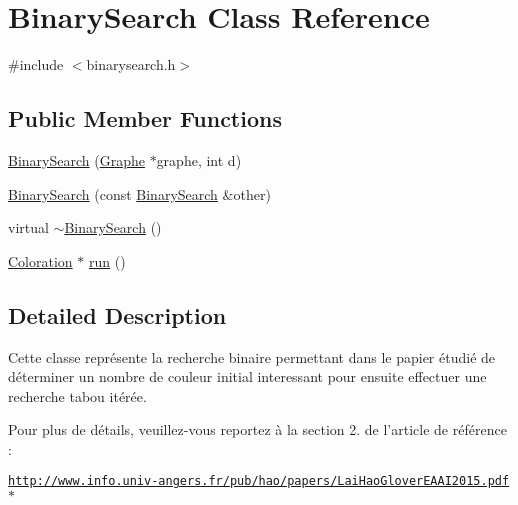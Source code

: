 \hypertarget{classBinarySearch}{\section{Binary\-Search Class Reference}
\label{classBinarySearch}
}


{\ttfamily \#include $<$binarysearch.\-h$>$}

\subsection*{Public Member Functions}
\begin{DoxyCompactItemize}
\item 
\hyperlink{classBinarySearch_a189641a6509564e762d4910efa5ff234}{Binary\-Search} (\hyperlink{classGraphe}{Graphe} $\ast$graphe, int d)
\item 
\hyperlink{classBinarySearch_a580de16a971e9cc0721bfe4ad438034e}{Binary\-Search} (const \hyperlink{classBinarySearch}{Binary\-Search} \&other)
\item 
virtual \hyperlink{classBinarySearch_a2b99e8ebae410b1af5456456f806f86f}{$\sim$\-Binary\-Search} ()
\item 
\hyperlink{classColoration}{Coloration} $\ast$ \hyperlink{classBinarySearch_a8c4be01a34f8a443889466a77fa4c437}{run} ()
\end{DoxyCompactItemize}


\subsection{Detailed Description}
Cette classe représente la recherche binaire permettant dans le papier étudié de déterminer un nombre de couleur initial interessant pour ensuite effectuer une recherche tabou itérée.

Pour plus de détails, veuillez-\/vous reportez à la section 2. de l'article de référence \-:

\href{http://www.info.univ-angers.fr/pub/hao/papers/LaiHaoGloverEAAI2015.pdf}{\tt http\-://www.\-info.\-univ-\/angers.\-fr/pub/hao/papers/\-Lai\-Hao\-Glover\-E\-A\-A\-I2015.\-pdf} $\ast$ 

